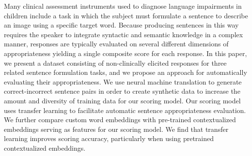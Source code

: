 Many clinical assessment instruments used to diagnose language impairments in children include a task in which the subject must formulate a sentence to describe an image using a specific target word. Because producing sentences in this way requires the speaker to integrate syntactic and semantic knowledge in a complex manner, responses are typically evaluated on several different dimensions of appropriateness yielding a single composite score for each response. In this paper, we present a dataset consisting of non-clinically elicited responses for three related sentence formulation tasks, and we propose an approach for automatically evaluating their appropriateness. We use neural machine translation to generate correct-incorrect sentence pairs in order to create synthetic data to increase the amount and diversity of training data for our scoring model. Our scoring model uses transfer learning to facilitate automatic sentence appropriateness evaluation. We further compare custom word embeddings with pre-trained contextualized embeddings serving as features for our scoring model. We find that transfer learning improves scoring accuracy, particularly when using pretrained contextualized embeddings.
